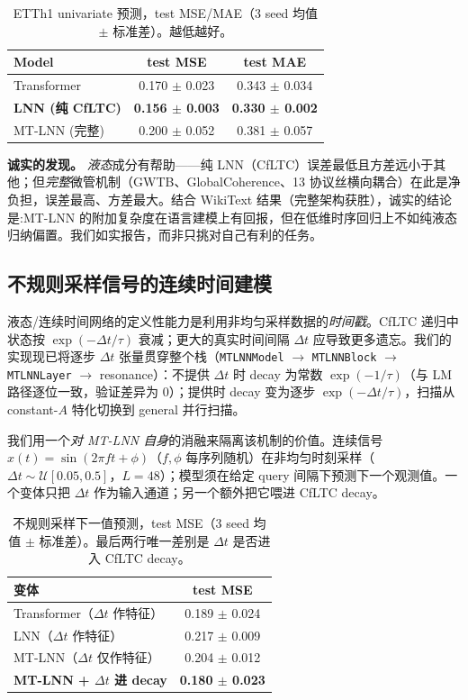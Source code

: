\documentclass[11pt]{article}
\theoremstyle{definition}
\begin{document}
\begin{table}[h]
\centering
\caption{ETTh1 univariate 预测，test MSE/MAE（3 seed 均值 $\pm$ 标准差）。越低越好。}
\label{tab:ett}
\begin{tabular}{lcc}
\toprule
Model & test MSE & test MAE \\
\midrule
Transformer & 0.170 $\pm$ 0.023 & 0.343 $\pm$ 0.034 \\
\textbf{LNN (纯 CfLTC)} & \textbf{0.156 $\pm$ 0.003} & \textbf{0.330 $\pm$ 0.002} \\
MT-LNN (完整) & 0.200 $\pm$ 0.052 & 0.381 $\pm$ 0.057 \\
\bottomrule
\end{tabular}
\end{table}

\textbf{诚实的发现。} \emph{液态}成分有帮助——纯 LNN（CfLTC）误差最低且方差远小于其他；但\emph{完整}微管机制（GWTB、GlobalCoherence、13 协议丝横向耦合）在此是净负担，误差最高、方差最大。结合 WikiText 结果（完整架构获胜），诚实的结论是:MT-LNN 的附加复杂度在语言建模上有回报，但在低维时序回归上不如纯液态归纳偏置。我们如实报告，而非只挑对自己有利的任务。

\subsection{不规则采样信号的连续时间建模}
\label{sec:irregular}
液态/连续时间网络的定义性能力是利用非均匀采样数据的\emph{时间戳}。CfLTC 递归中状态按 $\exp(-\Delta t/\tau)$ 衰减；更大的真实时间间隔 $\Delta t$ 应导致更多遗忘。我们的实现现已将逐步 $\Delta t$ 张量贯穿整个栈（\texttt{MTLNNModel} $\to$ \texttt{MTLNNBlock} $\to$ \texttt{MTLNNLayer} $\to$ resonance）：不提供 $\Delta t$ 时 decay 为常数 $\exp(-1/\tau)$（与 LM 路径逐位一致，验证差异为 $0$）；提供时 decay 变为逐步 $\exp(-\Delta t/\tau)$，扫描从 constant-$A$ 特化切换到 general 并行扫描。

我们用一个\emph{对 MT-LNN 自身}的消融来隔离该机制的价值。连续信号 $x(t)=\sin(2\pi f t + \phi)$（$f,\phi$ 每序列随机）在非均匀时刻采样（$\Delta t \sim \mathcal{U}[0.05,0.5]$，$L=48$）；模型须在给定 query 间隔下预测下一个观测值。一个变体只把 $\Delta t$ 作为输入通道；另一个额外把它喂进 CfLTC decay。

\begin{table}[h]
\centering
\caption{不规则采样下一值预测，test MSE（3 seed 均值 $\pm$ 标准差）。最后两行唯一差别是 $\Delta t$ 是否进入 CfLTC decay。}
\label{tab:irregular}
\begin{tabular}{lc}
\toprule
变体 & test MSE \\
\midrule
Transformer（$\Delta t$ 作特征） & 0.189 $\pm$ 0.024 \\
LNN（$\Delta t$ 作特征） & 0.217 $\pm$ 0.009 \\
MT-LNN（$\Delta t$ 仅作特征） & 0.204 $\pm$ 0.012 \\
\textbf{MT-LNN + $\Delta t$ 进 decay} & \textbf{0.180 $\pm$ 0.023} \\
\bottomrule
\end{tabular}
\end{table}
\end{document}
